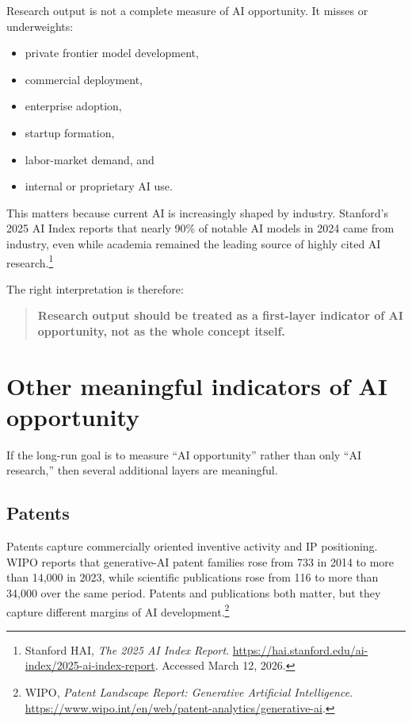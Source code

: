 \documentclass[11pt]{article}
\begin{document}
Research output is not a complete measure of AI opportunity. It misses or underweights:

\begin{itemize}[leftmargin=*]
  \item private frontier model development,
  \item commercial deployment,
  \item enterprise adoption,
  \item startup formation,
  \item labor-market demand, and
  \item internal or proprietary AI use.
\end{itemize}

This matters because current AI is increasingly shaped by industry. Stanford's 2025 AI Index reports that nearly 90\% of notable AI models in 2024 came from industry, even while academia remained the leading source of highly cited AI research.\footnote{Stanford HAI, \emph{The 2025 AI Index Report}. \url{https://hai.stanford.edu/ai-index/2025-ai-index-report}. Accessed March 12, 2026.}

The right interpretation is therefore:

\begin{quote}
\textbf{Research output should be treated as a first-layer indicator of AI opportunity, not as the whole concept itself.}
\end{quote}

\section{Other meaningful indicators of AI opportunity}

If the long-run goal is to measure ``AI opportunity'' rather than only ``AI research,'' then several additional layers are meaningful.

\subsection{Patents}

Patents capture commercially oriented inventive activity and IP positioning. WIPO reports that generative-AI patent families rose from 733 in 2014 to more than 14,000 in 2023, while scientific publications rose from 116 to more than 34,000 over the same period. Patents and publications both matter, but they capture different margins of AI development.\footnote{WIPO, \emph{Patent Landscape Report: Generative Artificial Intelligence}. \url{https://www.wipo.int/en/web/patent-analytics/generative-ai}.}
\end{document}
